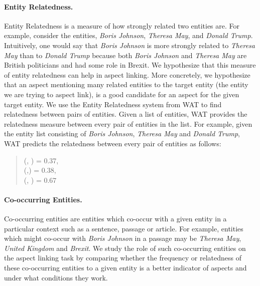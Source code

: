 \documentclass[sigconf,authordraft]{acmart}
\begin{document}
\paragraph{\textbf{Entity Relatedness. }}
Entity Relatedness is a measure of how strongly related two entities are. For example, consider the entities, \textit{Boris Johnson}, \textit{Theresa May}, and \textit{Donald Trump}. Intuitively, one would say that \textit{Boris Johnson} is more strongly related to \textit{Theresa May} than to \textit{Donald Trump} because both \textit{Boris Johnson} and \textit{Theresa May} are British politicians and had some role in Brexit. We hypothesize that this measure of entity relatedness can help in aspect linking. More concretely, we hypothesize that an aspect mentioning many related entities to the target entity (the entity we are trying to aspect link), is a good candidate for an aspect for the given target entity. 
We use the Entity Relatedness system from WAT \cite{piccinno2014wat} to find relatedness between pairs of entities. Given a list of entities, WAT provides the relatedness measure between every pair of entities in the list. For example, given the entity list consisting of \textit{Boris Johnson}, \textit{Theresa May} and \textit{Donald Trump}, WAT predicts the relatedness between every pair of entities as follows:
\begin{quote}
    (, ) = 0.37, \\
    (,)    = 0.38, \\
    (, )  = 0.67
\end{quote}

\paragraph{\textbf{Co-occurring Entities.}}
Co-occurring entities are entities which co-occur with a given entity in a particular context such as a sentence, passage or article. For example, entities which might co-occur with \textit{Boris Johnson} in a passage may be \textit{Theresa May}, \textit{United Kingdom} and \textit{Brexit}. We study the role of such co-occurring entities on the aspect linking task by comparing whether the frequency or relatedness of these co-occurring entities to a given entity is a better indicator of aspects and under what conditions they work. 

\end{document}
